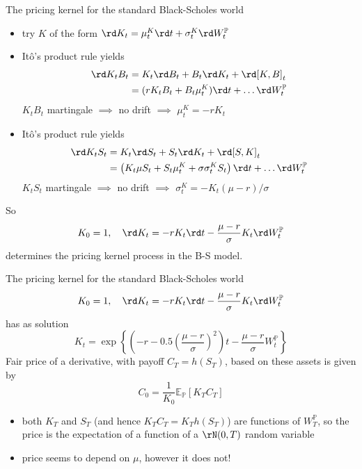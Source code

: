 \documentclass[pdf, handout]{beamer}
\begin{document}
\begin{frame}{The pricing kernel for the standard Black-Scholes world}
\small{
\begin{itemize}
\item try $K$ of the form
$
\rd K_t=\mu^K_t \rd t + \sigma^K_t \rd W_t^{\mathbb{P}}
$
\item It\^{o}'s product rule yields
\begin{align*}
\rd K_t B_t&=K_t \rd B_t + B_t \rd K_t+ \rd [K,B]_t\\
&=( r K_t B_t + B_t \mu^K_t) \rd t + \ldots \rd W_t^{\mathbb{P}}
\end{align*}
$K_tB_t$ martingale $\implies$ no drift $\implies$ $\mu^K_t=-rK_t$
\item
It\^{o}'s product rule yields
\begin{align*}
\rd K_t S_t&=K_t \rd S_t + S_t \rd K_t+ \rd [S,K]_t\\
&=\left(  K_t\mu S_t + S_t\mu^K_t+ \sigma \sigma^K_t S_t\right)   \rd t + \ldots \rd W_t^{\mathbb{P}}
\end{align*}
$K_tS_t$ martingale $\implies$ no drift $\implies$ $\sigma^K_t=-K_t(\mu-r)/\sigma$
\end{itemize}
So
\[
K_0=1,\quad \rd K_t=-rK_t \rd t  -\frac{\mu-r}{\sigma} K_t \rd W_t^{\mathbb{P}}
\]
determines the pricing kernel process in the B-S model.
}
\end{frame}
%
\begin{frame}{The pricing kernel for the standard Black-Scholes world}
\[
K_0=1,\quad \rd K_t=-rK_t \rd t  -\frac{\mu-r}{\sigma} K_t \rd W_t^{\mathbb{P}}
\]
has as solution
\[
K_t=\exp\left\{
\left(-r-0.5\left(\frac{\mu-r}{\sigma}\right)^2 \right)t -\frac{\mu-r}{\sigma} W_t^{\mathbb{P}}
\right\}
\]
Fair price of a derivative, with payoff $C_T=h(S_T)$, based on these assets is given by
\[
C_0=\frac{1}{K_0}\mathbb{E}_{\mathbb{P}}[ K_T C_T ]
\]
\begin{itemize}
\item both $K_T$ and $S_T$ (and hence $K_T C_T=K_T h(S_T)$) are functions of $W_T^{\mathbb{P}}$, so the price is the expectation of a function of a $\rN(0,T)$ random variable
\item price seems to depend on $\mu$, however it does not!
\end{itemize}
\end{frame}
\end{document}
